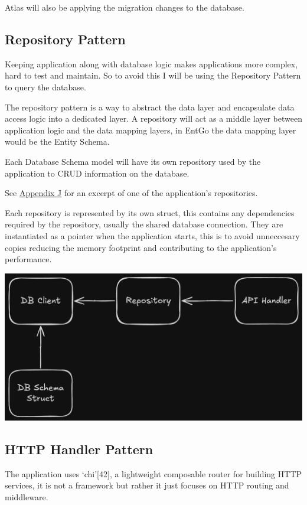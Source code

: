 \documentclass{article}
\begin{document}
  Atlas will also be applying the migration changes to the database.

  \subsection{Repository Pattern}

  Keeping application along with database logic makes applications more complex, hard to test and maintain. So to avoid this I will be using the Repository Pattern to query the database.

  The repository pattern is a way to abstract the data layer and encapsulate data access logic into a dedicated layer. A repository will act as a middle layer between application logic and the data mapping layers, in EntGo the data mapping layer would be the Entity Schema.

  Each Database Schema model will have its own repository used by the application to CRUD information on the database.

  See \hyperref[sec:appendix-j]{Appendix J} for an excerpt of one of the application's repositories.

  Each repository is represented by its own struct, this contains any dependencies required by the repository, usually the shared database connection. They are instantiated as a pointer when the application starts, this is to avoid unneccesary copies reducing the memory footprint and contributing to the application's performance.

  \includegraphics[scale=0.30]{repository_pattern.png}

  \subsection{HTTP Handler Pattern}

  The application uses `chi'[42], a lightweight composable router for building HTTP services, it is not a framework but rather it just focuses on HTTP routing and middleware.
\end{document}
